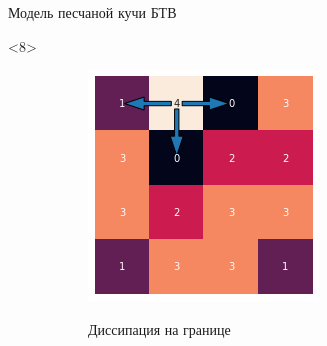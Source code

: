 \documentclass{beamer}
\begin{document}
\begin{frame}{Модель песчаной кучи БТВ}
		\begin{onlyenv}<8>
			\begin{figure}[ht]
				\centering
				\begin{subfigure}{0.45\textwidth}
					\includegraphics[width=\linewidth]{slides/btw_7}
				\end{subfigure}
				\begin{subfigure}{0.45\textwidth}
					Диссипация на границе
				\end{subfigure}
			\end{figure}
		\end{onlyenv}
	

\end{frame}
\end{document}
